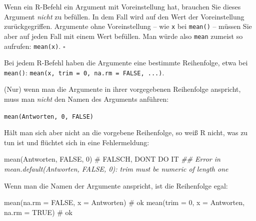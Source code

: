 \documentclass[
  a4paper,
]{scrbook}
\newenvironment{Shaded}{\begin{snugshade}}{\end{snugshade}}
\newcommand{\AttributeTok}[1]{\textcolor[rgb]{0.40,0.45,0.13}{#1}}
\newcommand{\CommentTok}[1]{\textcolor[rgb]{0.37,0.37,0.37}{#1}}
\newcommand{\ConstantTok}[1]{\textcolor[rgb]{0.56,0.35,0.01}{#1}}
\newcommand{\DecValTok}[1]{\textcolor[rgb]{0.68,0.00,0.00}{#1}}
\newcommand{\DocumentationTok}[1]{\textcolor[rgb]{0.37,0.37,0.37}{\textit{#1}}}
\newcommand{\FunctionTok}[1]{\textcolor[rgb]{0.28,0.35,0.67}{#1}}
\newcommand{\NormalTok}[1]{\textcolor[rgb]{0.00,0.23,0.31}{#1}}
\theoremstyle{definition}
\theoremstyle{definition}
\theoremstyle{definition}
\theoremstyle{remark}
\begin{document}
\begin{tcolorbox}[enhanced jigsaw, colbacktitle=quarto-callout-note-color!10!white, bottomrule=.15mm, left=2mm, breakable, rightrule=.15mm, coltitle=black, title=\textcolor{quarto-callout-note-color}{\faInfo}\hspace{0.5em}{Hinweis}, colback=white, leftrule=.75mm, titlerule=0mm, opacityback=0, bottomtitle=1mm, toprule=.15mm, arc=.35mm, toptitle=1mm, opacitybacktitle=0.6, colframe=quarto-callout-note-color-frame]

Wenn ein R-Befehl ein Argument mit Voreinstellung hat, brauchen Sie
dieses Argument \emph{nicht} zu befüllen. In dem Fall wird auf den Wert
der Voreinstellung zurückgegriffen. Argumente ohne Voreinstellung -- wie
\texttt{x} bei \texttt{mean()} -- müssen Sie aber auf jeden Fall mit
einem Wert befüllen. Man würde also \texttt{mean} zumeist so aufrufen:
\texttt{mean(x)}. \(\square\)

\end{tcolorbox}

Bei jedem R-Befehl haben die Argumente eine bestimmte Reihenfolge, etwa
bei \texttt{mean()}:
\texttt{mean(x,\ trim\ =\ 0,\ na.rm\ =\ FALSE,\ ...)}.

(Nur) wenn man die Argumente in ihrer vorgegebenen Reihenfolge
anspricht, muss man \emph{nicht} den Namen des Arguments anführen:

 \texttt{mean(Antworten,\ 0,\ FALSE)}

Hält man sich aber nicht an die vorgebene Reihenfolge, so weiß R nicht,
was zu tun ist und flüchtet sich in eine Fehlermeldung:

\begin{Shaded}
\begin{Highlighting}[]
\FunctionTok{mean}\NormalTok{(Antworten, }\ConstantTok{FALSE}\NormalTok{, }\DecValTok{0}\NormalTok{)  }\CommentTok{\# FALSCH, DON\textquotesingle{}T DO IT }
\DocumentationTok{\#\# Error in mean.default(Antworten, FALSE, 0): \textquotesingle{}trim\textquotesingle{} must be numeric of length one}
\end{Highlighting}
\end{Shaded}

Wenn man die Namen der Argumente anspricht, ist die Reihenfolge egal:

\begin{Shaded}
\begin{Highlighting}[]
\FunctionTok{mean}\NormalTok{(}\AttributeTok{na.rm =} \ConstantTok{FALSE}\NormalTok{, }\AttributeTok{x =}\NormalTok{ Antworten)  }\CommentTok{\# ok}
\FunctionTok{mean}\NormalTok{(}\AttributeTok{trim =} \DecValTok{0}\NormalTok{, }\AttributeTok{x =}\NormalTok{ Antworten, }\AttributeTok{na.rm =} \ConstantTok{TRUE}\NormalTok{)  }\CommentTok{\# ok}
\end{Highlighting}
\end{Shaded}
\end{document}
